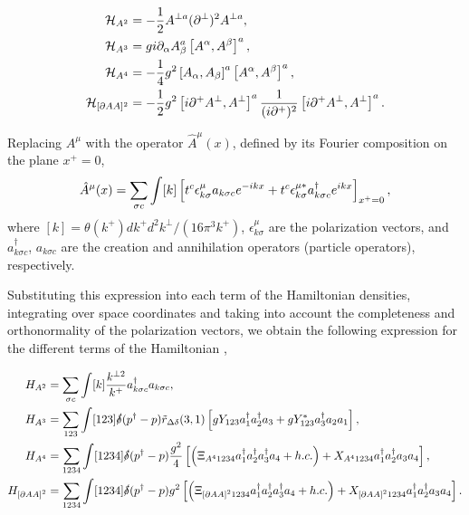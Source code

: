 \documentclass[11pt,a4paper,twoside,pdf]{article}
\numberwithin{equation}{section}
\begin{document}
\begin{align}
    \mathcal{H}_{A^2} &= -\frac{1}{2} A^{\perp a} (\partial^\perp)^2 A^{\perp a}, \\
    \mathcal{H}_{A^3} &= g i \partial_\alpha A^a_\beta \left[ A^\alpha, A^\beta \right]^a, \\
    \mathcal{H}_{A^4} &= -\frac{1}{4} g^2 \left[ A_\alpha, A_\beta \right]^a
    \left[ A^\alpha, A^\beta \right]^a, \\
    \mathcal{H}_{[\partial AA]^2} &= -\frac{1}{2} g^2 \left[ i \partial^+ A^\perp,
    A^\perp \right]^a  \frac{1}{(i\partial^+)^2} \left[ i\partial^+ A^\perp, A^\perp \right]^a.
\end{align}

Replacing $A^\mu$ with the operator $\hat{A}^\mu(x)$, defined by its Fourier composition
on the plane $x^+=0$,
\begin{equation}
    \hat{A}^\mu(x) = \sum _{\sigma c} \int [k] \left[ t^c \epsilon^\mu_{k \sigma} 
    a_{k\sigma c}  e^{-ikx} + t^c \epsilon^{\mu*}_{k \sigma} 
    a^\dagger_{k\sigma c}  e^{ikx} \right]_{x^+=0},
\end{equation}
where $[k] = \theta(k^+) dk^+ d^2k^\perp / (16\pi^3k^+)$, $\epsilon^\mu_{k \sigma}$ 
are the polarization vectors, and $a^\dagger_{k\sigma c}$, $a_{k\sigma c}$ are the 
creation and annihilation operators (particle operators), respectively. 


Substituting this expression into each term of the Hamiltonian densities, integrating
over space coordinates and taking into account the completeness and orthonormality 
of the polarization vectors, we obtain the following expression for the different
terms of the Hamiltonian \cite{QCDG}, 

\begin{align}
    H_{A^2} &= \sum_{\sigma c} \int [k] \frac{k^{\perp 2}}{k^+}a^\dagger_{k\sigma c}
    a_{k\sigma c}, \label{eq:H_A^2}\\
    H_{A^3} &= \sum_{123} \int [123] \slashed{\delta}(p^\dagger - p) \tilde{r}_{\Delta \delta}
    (3, 1) \left[ gY_{123}a_1^\dagger a_2^\dagger a_3 + gY_{123}^*a_3^\dagger a_2 a_1 \right],
    \label{eq:H_A^3}\\
    H_{A^4} &= \sum_{1234} \int [1234] \slashed{\delta}(p^\dagger - p) \frac{g^2}{4}
    \left[ \left( \Xi_{A^4 1234} a_1^\dagger a_2^\dagger a_3^\dagger a_4 + h.c. \right)+ X_{A^4 1234} 
    a_1^\dagger a_2^\dagger a_3 a_4  \right], \label{eq:H_A^4}\\
    H_{\left[ \partial A A \right]^2} &= \sum_{1234} \int [1234] \slashed{\delta}
    (p^\dagger - p) g^2 \left[ \left( \Xi_{\left[ \partial A A \right]^2 1234}
    a_1^\dagger a_2^\dagger a_3^\dagger a_4 + h.c. \right) + X_{\left[ \partial A A \right]^2 
    1234} a_1^\dagger a_2^\dagger a_3 a_4  \right] \label{eq:H_partial}.
\end{align}
\end{document}
